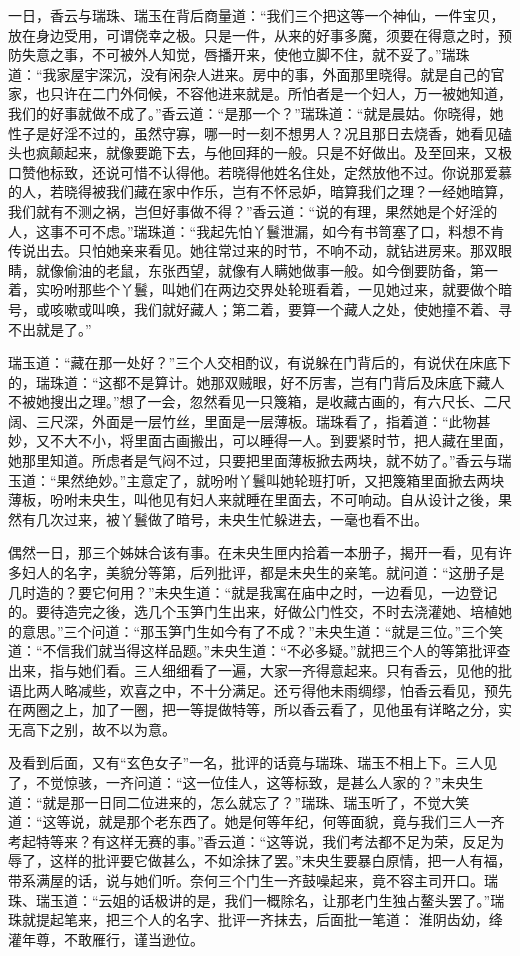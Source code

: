 \documentclass[a4paper,12pt,UTF8,twoside]{ctexbook}
\begin{document}
一日，香云与瑞珠、瑞玉在背后商量道：“我们三个把这等一个神仙，一件宝贝，放在身边受用，可谓侥幸之极。只是一件，从来的好事多魔，须要在得意之时，预防失意之事，不可被外人知觉，唇播开来，使他立脚不住，就不妥了。”瑞珠道：“我家屋宇深沉，没有闲杂人进来。房中的事，外面那里晓得。就是自己的官家，也只许在二门外伺候，不容他进来就是。所怕者是一个妇人，万一被她知道，我们的好事就做不成了。”香云道：“是那一个？”瑞珠道：“就是晨姑。你晓得，她性子是好淫不过的，虽然守寡，哪一时一刻不想男人？况且那日去烧香，她看见磕头也疯颠起来，就像要跪下去，与他回拜的一般。只是不好做出。及至回来，又极口赞他标致，还说可惜不认得他。若晓得他姓名住处，定然放他不过。你说那爱慕的人，若晓得被我们藏在家中作乐，岂有不怀忌妒，暗算我们之理？一经她暗算，我们就有不测之祸，岂但好事做不得？”香云道：“说的有理，果然她是个好淫的人，这事不可不虑。”瑞珠道：“我起先怕丫鬟泄漏，如今有书笥塞了口，料想不肯传说出去。只怕她亲来看见。她往常过来的时节，不响不动，就钻进房来。那双眼睛，就像偷油的老鼠，东张西望，就像有人瞒她做事一般。如今倒要防备，第一着，实吩咐那些个丫鬟，叫她们在两边交界处轮班看着，一见她过来，就要做个暗号，或咳嗽或叫唤，我们就好藏人；第二着，要算一个藏人之处，使她撞不着、寻不出就是了。”

瑞玉道：“藏在那一处好？”三个人交相酌议，有说躲在门背后的，有说伏在床底下的，瑞珠道：“这都不是算计。她那双贼眼，好不厉害，岂有门背后及床底下藏人不被她搜出之理。”想了一会，忽然看见一只篾箱，是收藏古画的，有六尺长、二尺阔、三尺深，外面是一层竹丝，里面是一层薄板。瑞珠看了，指着道：“此物甚妙，又不大不小，将里面古画搬出，可以睡得一人。到要紧时节，把人藏在里面，她那里知道。所虑者是气闷不过，只要把里面薄板掀去两块，就不妨了。”香云与瑞玉道：“果然绝妙。”主意定了，就吩咐丫鬟叫她轮班打听，又把篾箱里面掀去两块薄板，吩咐未央生，叫他见有妇人来就睡在里面去，不可响动。自从设计之後，果然有几次过来，被丫鬟做了暗号，未央生忙躲进去，一毫也看不出。

偶然一日，那三个姊妹合该有事。在未央生匣内拾着一本册子，揭开一看，见有许多妇人的名字，美貌分等第，后列批评，都是未央生的亲笔。就问道：“这册子是几时造的？要它何用？”未央生道：“就是我寓在庙中之时，一边看见，一边登记的。要待造完之後，选几个玉笋门生出来，好做公门性交，不时去浇灌她、培植她的意思。”三个问道：“那玉笋门生如今有了不成？”未央生道：“就是三位。”三个笑道：“不信我们就当得这样品题。”未央生道：“不必多疑。”就把三个人的等第批评查出来，指与她们看。三人细细看了一遍，大家一齐得意起来。只有香云，见他的批语比两人略减些，欢喜之中，不十分满足。还亏得他未雨绸缪，怕香云看见，预先在两圈之上，加了一圈，把一等提做特等，所以香云看了，见他虽有详略之分，实无高下之别，故不以为意。

及看到后面，又有“玄色女子”一名，批评的话竟与瑞珠、瑞玉不相上下。三人见了，不觉惊骇，一齐问道：“这一位佳人，这等标致，是甚么人家的？”未央生道：“就是那一日同二位进来的，怎么就忘了？”瑞珠、瑞玉听了，不觉大笑道：“这等说，就是那个老东西了。她是何等年纪，何等面貌，竟与我们三人一齐考起特等来？有这样无赛的事。”香云道：“这等说，我们考法都不足为荣，反足为辱了，这样的批评要它做甚么，不如涂抹了罢。”未央生要暴白原情，把一人有福，带系满屋的话，说与她们听。奈何三个门生一齐鼓噪起来，竟不容主司开口。瑞珠、瑞玉道：“云姐的话极讲的是，我们一概除名，让那老门生独占鳌头罢了。”瑞珠就提起笔来，把三个人的名字、批评一齐抹去，后面批一笔道：
淮阴齿幼，绛灌年尊，不敢雁行，谨当逊位。
\end{document}
